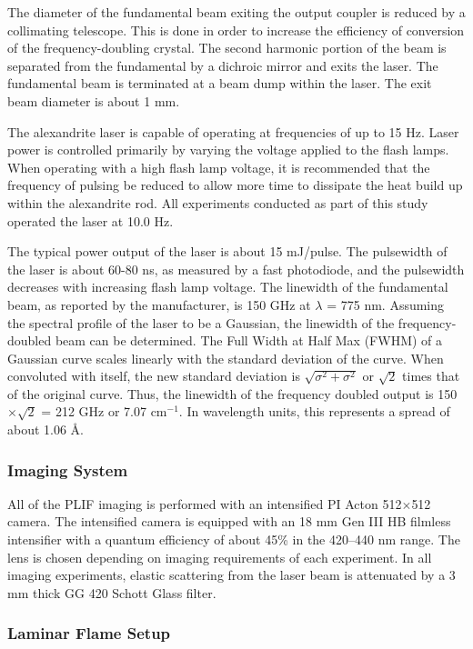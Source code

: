 The diameter of the fundamental beam exiting the output coupler is reduced by a collimating telescope.
This is done in order to increase the efficiency of conversion of the frequency-doubling crystal.
The second harmonic portion of the beam is separated from the fundamental by a dichroic mirror and exits the laser.
The fundamental beam is terminated at a beam dump within the laser.
The exit beam diameter is about 1 mm.

The alexandrite laser is capable of operating at frequencies of up to 15 Hz.
Laser power is controlled primarily by varying the voltage applied to the flash lamps.
When operating with a high flash lamp voltage, it is recommended that the frequency of pulsing be reduced to allow more time to dissipate the heat build up within the alexandrite rod.
All experiments conducted as part of this study operated the laser at 10.0 Hz.

The typical power output of the laser is about 15 mJ/pulse.
The pulsewidth of the laser is about 60-80 ns, as measured by a fast photodiode, and the pulsewidth decreases with increasing flash lamp voltage.
The linewidth of the fundamental beam, as reported by the manufacturer, is 150 GHz at \(\lambda\) = 775 nm.
Assuming the spectral profile of the laser to be a Gaussian, the linewidth of the frequency-doubled beam can be determined.
The Full Width at Half Max (FWHM) of a Gaussian curve scales linearly with the standard deviation of the curve.
When convoluted with itself, the new standard deviation is \(\sqrt{\sigma^2 + \sigma^2}\) or \(\sqrt{2}\) times that of the original curve.
Thus, the linewidth of the frequency doubled output is 150 \(\times\sqrt{2}\) = 212 GHz or 7.07 cm\(^{-1}\).
In wavelength units, this represents a spread of about 1.06 \AA.

\subsubsection{Imaging System}
\label{subsubsec:plif-imaging-system}

All of the PLIF imaging is performed with an intensified PI Acton 512\(\times\)512 camera.
The intensified camera is equipped with an 18 mm Gen III HB filmless intensifier with a quantum efficiency of about 45\% in the 420--440 nm range.
The lens is chosen depending on imaging requirements of each experiment.
In all imaging experiments, elastic scattering from the laser beam is attenuated by a 3 mm thick GG 420 Schott Glass filter.

\subsubsection{Laminar Flame Setup}
\label{subsubsec:plif-laminar-flame-setup}

